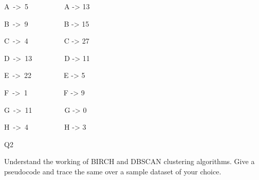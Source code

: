 \documentclass[12pt]{article}
\renewcommand{\_}{\kern-1.5pt\textunderscore\kern-1.5pt}
\begin{document}
A\ ->\ 5\ \ \ \ \ \ \ \ \ \    A -> 13\par

B\ ->\ 9\ \ \ \ \ \ \ \ \ \    B -> 15\par

C\ ->\ 4\ \ \ \ \ \ \ \ \ \    C -> 27\par

D\ ->\ 13\ \ \ \ \ \ \ \ \    D -> 11\par

E\ ->\ 22\ \ \ \ \ \ \ \ \    E -> 5\par

F\ ->\ 1\ \ \ \ \ \ \ \ \ \    F -> 9\par

G\ ->\ 11\ \ \ \ \ \ \ \ \    G -> 0\par

H\ ->\ 4\ \ \ \ \ \ \ \ \ \    H -> 3\par


\vspace{\baselineskip}
\vspace{\baselineskip}
\vspace{\baselineskip}
\setlength{\parskip}{8.04pt}

\vspace{\baselineskip}

\vspace{\baselineskip}

\vspace{\baselineskip}

\vspace{\baselineskip}

\vspace{\baselineskip}
\begin{Center}
{\fontsize{28pt}{33.6pt}\selectfont Q2\par}
\end{Center}\par

{\fontsize{14pt}{16.8pt}\selectfont Understand the working of BIRCH and DBSCAN clustering algorithms. Give a pseudocode and trace the same over a sample dataset of your choice.\par}\par
\end{document}
